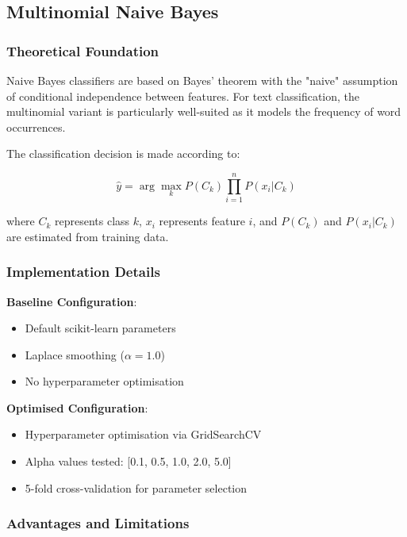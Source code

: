 \documentclass[11pt,a4paper]{article}
\begin{document}
\subsection{Multinomial Naive Bayes}

\subsubsection{Theoretical Foundation}

Naive Bayes classifiers are based on Bayes' theorem with the "naive" assumption of conditional independence between features. For text classification, the multinomial variant is particularly well-suited as it models the frequency of word occurrences.

The classification decision is made according to:

\begin{equation}
\hat{y} = \arg\max_{k} P(C_k) \prod_{i=1}^{n} P(x_i|C_k)
\end{equation}

where $C_k$ represents class $k$, $x_i$ represents feature $i$, and $P(C_k)$ and $P(x_i|C_k)$ are estimated from training data.

\subsubsection{Implementation Details}

\textbf{Baseline Configuration}:
\begin{itemize}
    \item Default scikit-learn parameters
    \item Laplace smoothing ($\alpha = 1.0$)
    \item No hyperparameter optimisation
\end{itemize}

\textbf{Optimised Configuration}:
\begin{itemize}
    \item Hyperparameter optimisation via GridSearchCV
    \item Alpha values tested: [0.1, 0.5, 1.0, 2.0, 5.0]
    \item 5-fold cross-validation for parameter selection
\end{itemize}

\subsubsection{Advantages and Limitations}
\end{document}
